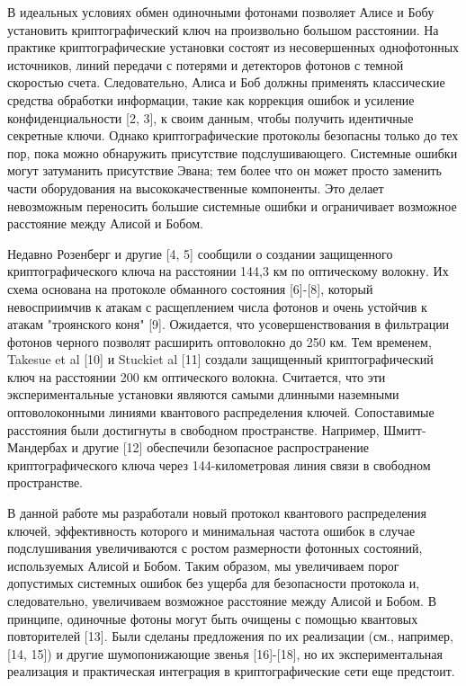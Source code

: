 В идеальных условиях обмен одиночными фотонами позволяет Алисе и Бобу установить криптографический ключ на произвольно большом расстоянии. На практике криптографические установки состоят из несовершенных однофотонных источников, линий передачи с потерями и детекторов фотонов с темной скоростью счета. Следовательно, Алиса и Боб должны применять классические средства обработки информации, такие как коррекция ошибок и усиление конфиденциальности [2, 3], к своим данным, чтобы получить идентичные секретные ключи. Однако криптографические протоколы безопасны только до тех пор, пока можно обнаружить присутствие подслушивающего. Системные ошибки могут затуманить присутствие Эвана; тем более что он может просто заменить части оборудования на высококачественные компоненты. Это делает невозможным переносить большие системные ошибки и ограничивает возможное расстояние между Алисой и Бобом.

Недавно Розенберг и другие [4, 5] сообщили о создании защищенного криптографического ключа на расстоянии 144,3 км по оптическому волокну. Их схема основана на протоколе обманного состояния [6]-[8], который невосприимчив к атакам с расщеплением числа фотонов и очень устойчив к атакам "троянского коня" [9]. Ожидается, что усовершенствования в фильтрации фотонов черного позволят расширить оптоволокно до 250 км. Тем временем, Takesue et al [10] и Stuckiet al [11] создали защищенный криптографический ключ на расстоянии 200 км оптического волокна. Считается, что эти экспериментальные установки являются самыми длинными наземными оптоволоконными линиями квантового распределения ключей. Сопоставимые расстояния были достигнуты в свободном пространстве. Например, Шмитт-Мандербах и другие [12] обеспечили безопасное распространение криптографического ключа через
144-километровая линия связи в свободном пространстве.

В данной работе мы разработали новый протокол квантового распределения ключей, эффективность которого и минимальная частота ошибок в случае подслушивания увеличиваются с ростом размерности фотонных состояний, используемых Алисой и Бобом. Таким образом, мы увеличиваем порог допустимых системных ошибок без ущерба для безопасности протокола и, следовательно, увеличиваем возможное расстояние между Алисой и Бобом. В принципе, одиночные фотоны могут быть очищены с помощью квантовых повторителей [13]. Были сделаны предложения по их реализации (см., например, [14, 15]) и другие шумопонижающие звенья [16]-[18], но их экспериментальная реализация и практическая интеграция в криптографические сети еще предстоит.

